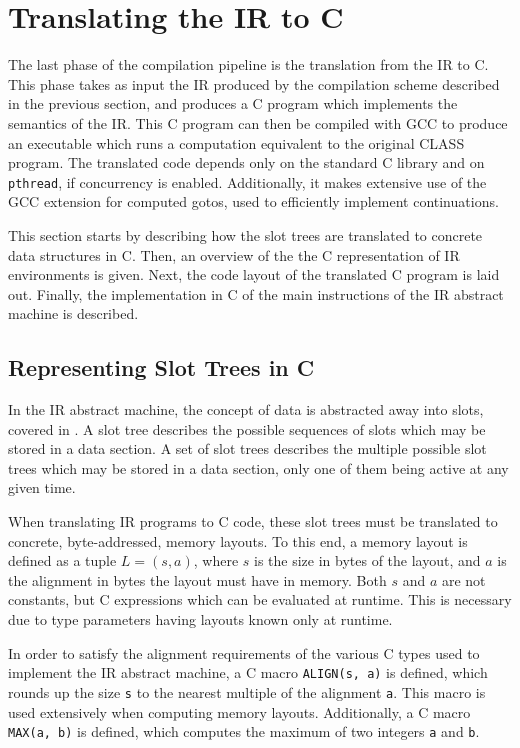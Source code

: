 \section{Translating the IR to C} \label{section:IRtoC}

The last phase of the compilation pipeline is the translation from the \ac{IR} to C. This phase takes as input the \ac{IR} produced by the compilation scheme described in the previous section, and produces a C program which implements the semantics of the \ac{IR}. This C program can then be compiled with \ac{GCC} to produce an executable which runs a computation equivalent to the original \ac{CLASS} program. The translated code depends only on the standard C library and on \texttt{pthread}, if concurrency is enabled. Additionally, it makes extensive use of the \ac{GCC} extension for computed gotos, used to efficiently implement continuations.

This section starts by describing how the slot trees are translated to concrete data structures in C. Then, an overview of the the C representation of \ac{IR} environments is given. Next, the code layout of the translated C program is laid out. Finally, the implementation in C of the main instructions of the \ac{IR} abstract machine is described.

\subsection{Representing Slot Trees in C}

In the \ac{IR} abstract machine, the concept of data is abstracted away into slots, covered in . A slot tree describes the possible sequences of slots which may be stored in a data section. A set of slot trees describes the multiple possible slot trees which may be stored in a data section, only one of them being active at any given time.

When translating \ac{IR} programs to C code, these slot trees must be translated to concrete, byte-addressed, memory layouts. To this end, a memory layout is defined as a tuple $L = (s, a)$, where $s$ is the size in bytes of the layout, and $a$ is the alignment in bytes the layout must have in memory. Both $s$ and $a$ are not constants, but C expressions which can be evaluated at runtime. This is necessary due to type parameters having layouts known only at runtime.

In order to satisfy the alignment requirements of the various C types used to implement the \ac{IR} abstract machine, a C macro \texttt{ALIGN(s, a)} is defined, which rounds up the size \texttt{s} to the nearest multiple of the alignment \texttt{a}. This macro is used extensively when computing memory layouts. Additionally, a C macro \texttt{MAX(a, b)} is defined, which computes the maximum of two integers \texttt{a} and \texttt{b}.

